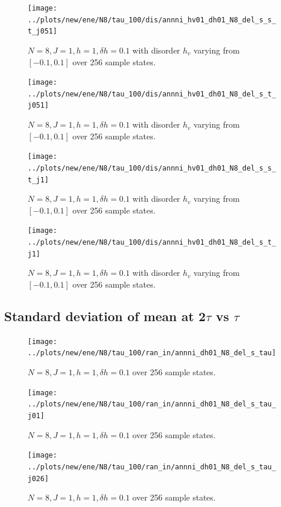 \documentclass[a4paper]{article}
\begin{document}
\begin{figure}[h!]
  \centering
  \texttt{[image: ../plots/new/ene/N8/tau\_100/dis/annni\_hv01\_dh01\_N8\_del\_s\_s\_t\_j051]}
  \caption{$N = 8, J = 1, h = 1, \delta h=0.1$ with disorder $h_v$ varying from $[-0.1,0.1]$ over 256 sample states.}
  \label{fig:}
\end{figure}

\begin{figure}[h!]
  \centering
  \texttt{[image: ../plots/new/ene/N8/tau\_100/dis/annni\_hv01\_dh01\_N8\_del\_s\_t\_j051]}
  \caption{$N = 8, J = 1, h = 1, \delta h=0.1$ with disorder $h_v$ varying from $[-0.1,0.1]$ over 256 sample states.}
  \label{fig:}
\end{figure}

\begin{figure}[h!]
  \centering
  \texttt{[image: ../plots/new/ene/N8/tau\_100/dis/annni\_hv01\_dh01\_N8\_del\_s\_s\_t\_j1]}
  \caption{$N = 8, J = 1, h = 1, \delta h=0.1$ with disorder $h_v$ varying from $[-0.1,0.1]$ over 256 sample states.}
  \label{fig:}
\end{figure}

\begin{figure}[h!]
  \centering
  \texttt{[image: ../plots/new/ene/N8/tau\_100/dis/annni\_hv01\_dh01\_N8\_del\_s\_t\_j1]}
  \caption{$N = 8, J = 1, h = 1, \delta h=0.1$ with disorder $h_v$ varying from $[-0.1,0.1]$ over 256 sample states.}
  \label{fig:}
\end{figure}





\clearpage
\subsection{Standard deviation of mean at 2$\tau$ vs $\tau$}
\begin{figure}[h!]
  \centering
  \texttt{[image: ../plots/new/ene/N8/tau\_100/ran\_in/annni\_dh01\_N8\_del\_s\_tau]}
  \caption{$N = 8, J = 1, h = 1, \delta h=0.1$ over 256 sample states.}
  \label{fig:}
\end{figure}

\begin{figure}[h!]
  \centering
  \texttt{[image: ../plots/new/ene/N8/tau\_100/ran\_in/annni\_dh01\_N8\_del\_s\_tau\_j01]}
  \caption{$N = 8, J = 1, h = 1, \delta h=0.1$ over 256 sample states.}
  \label{fig:}
\end{figure}

\begin{figure}[h!]
  \centering
  \texttt{[image: ../plots/new/ene/N8/tau\_100/ran\_in/annni\_dh01\_N8\_del\_s\_tau\_j026]}
  \caption{$N = 8, J = 1, h = 1, \delta h=0.1$ over 256 sample states.}
  \label{fig:}
\end{figure}
\end{document}
